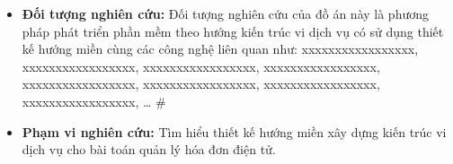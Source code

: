 \begin{itemize}

\item \textbf{Đối tượng nghiên cứu:} Đối tượng nghiên cứu của đồ án này là phương pháp phát triển phần mềm theo hướng kiến trúc vi dịch vụ có sử dụng thiết kế hướng miền cùng các công nghệ liên quan như: xxxxxxxxxxxxxxxxx, xxxxxxxxxxxxxxxxx, xxxxxxxxxxxxxxxxx, xxxxxxxxxxxxxxxxx, xxxxxxxxxxxxxxxxx, xxxxxxxxxxxxxxxxx, xxxxxxxxxxxxxxxxx, xxxxxxxxxxxxxxxxx, \dots
#
\item \textbf{Phạm vi nghiên cứu:} Tìm hiểu thiết kế hướng miền xây dựng kiến trúc vi dịch vụ cho bài toán quản lý hóa đơn điện tử.

\end{itemize}